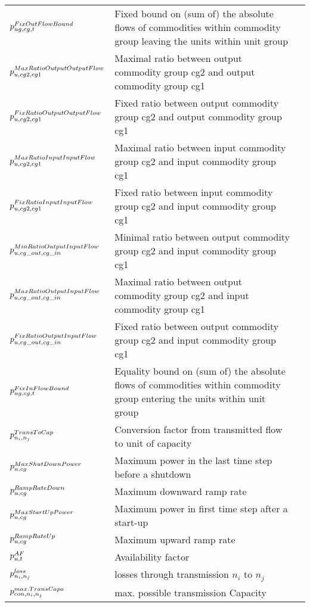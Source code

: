 \begin{longtable}{p{\cola} p{\colc} >{\small\raggedleft\arraybackslash\itshape}p{\colb}}
		$p^{FixOutFlowBound}_{ug,cg,t}$	& Fixed bound on (sum of) the absolute flows of commodities within commodity group \commoditygroup leaving the units within unit group \unitgroup 	&                \\
		$p^{MaxRatioOutputOutputFlow}_{u,cg2,cg1}$	& Maximal ratio between output commodity group cg2 and output commodity group cg1	&                \\
		$p^{FixRatioOutputOutputFlow}_{u,cg2,cg1}$	& Fixed ratio between output commodity group cg2 and output commodity group cg1	&                \\
		$p^{MaxRatioInputInputFlow}_{u,cg2,cg1}$	& Maximal ratio between input commodity group cg2 and input commodity group cg1	&                \\
		$p^{FixRatioInputInputFlow}_{u,cg2,cg1}$	& Fixed ratio between input commodity group cg2 and input commodity group cg1	&                \\
		$p^{MinRatioOutputInputFlow}_{u,cg\_out,cg\_in}$	& Minimal ratio between output commodity group cg2 and input commodity group cg1	&                \\
		$p^{MaxRatioOutputInputFlow}_{u,cg\_out,cg\_in}$	& Maximal ratio between output commodity group cg2 and input commodity group cg1	&                \\
		$p^{FixRatioOutputInputFlow}_{u,cg\_out,cg\_in}$	& Fixed ratio between output commodity group cg2 and input commodity group cg1	&                \\
		$p^{FixInFlowBound}_{ug,cg,t}$	& Equality bound on (sum of) the absolute flows of commodities within commodity group \commoditygroup entering the units within unit group \unitgroup 	&                \\
		$p^{TransToCap}_{n_i,n_j}   $	& Conversion factor from transmitted flow to unit of capacity 	&                \\
		$p^{MaxShutDownPower}_{u,cg}$	& Maximum power in the last time step before a shutdown       	&                \\
		$p^{RampRateDown}_{u,cg} $	& Maximum downward ramp rate                                  	&                \\
		$p^{MaxStartUpPower}_{u,cg}$	& Maximum power in first time step after a start-up           	&                \\
		$p^{RampRateUp}_{u,cg}   $	& Maximum upward ramp rate                                    	&                \\
		$p^{AF}_{u,t}           $	& Availability factor                                         	&                \\[0.5em]

		$p^{loss}_{n_i,n_j}    $	& losses through transmission $n_i$ to $n_j$                  	&                \\
		$p^{max.TransCapa}_{{con},n_i,n_j} $	& max. possible transmission Capacity                         	&                \\
	\end{longtable}

